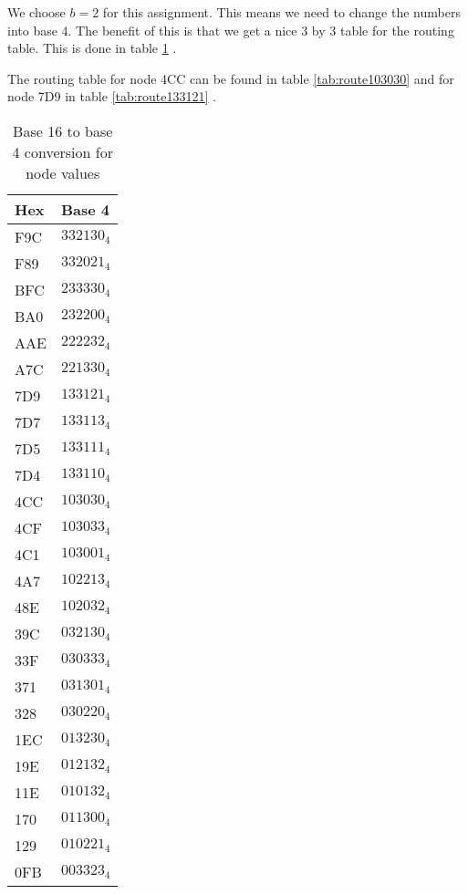 \documentclass{article}
\begin{document}
We choose $b = 2$ for this assignment. This means we need to change the numbers into base 4. The benefit of this is that we get a nice 3 by 3 table for the routing table. This is done in table \ref{tab:b16b4conv} .

The routing table for node 4CC can be found in table \ref{tab:route103030} and for node 7D9 in table \ref{tab:route133121} .

\begin{table}[ht!]
    \begin{center}
    \begin{tabular}{| l | l |}
    \hline
    \bf{Hex}  & \bf{Base 4} \\
    \hline
    F9C         & $ 332130_4 $ \\
    \hline
    F89         & $ 332021_4 $ \\
    \hline
    BFC         & $ 233330_4 $ \\
    \hline
    BA0         & $ 232200_4 $ \\
    \hline
    AAE         & $ 222232_4 $ \\
    \hline
    A7C         & $ 221330_4 $ \\
    \hline
    7D9         & $ 133121_4 $ \\
    \hline
    7D7         & $ 133113_4 $ \\
    \hline
    7D5         & $ 133111_4 $ \\
    \hline
    7D4         & $ 133110_4 $ \\
    \hline
    4CC         & $ 103030_4 $ \\
    \hline
    4CF         & $ 103033_4 $ \\
    \hline
    4C1         & $ 103001_4 $ \\
    \hline
    4A7         & $ 102213_4 $ \\
    \hline
    48E         & $ 102032_4 $ \\
    \hline
    39C         & $ 032130_4 $ \\
    \hline
    33F         & $ 030333_4 $ \\
    \hline
    371         & $ 031301_4 $ \\
    \hline
    328         & $ 030220_4 $ \\
    \hline
    1EC         & $ 013230_4 $ \\
    \hline
    19E         & $ 012132_4 $ \\
    \hline
    11E         & $ 010132_4 $ \\
    \hline
    170         & $ 011300_4 $ \\
    \hline
    129         & $ 010221_4 $ \\
    \hline
    0FB         & $ 003323_4 $ \\
    \hline
    \end{tabular}
    \caption{Base 16 to base 4 conversion for node values}
    \label{tab:b16b4conv}
    \end{center}
\end{table}
\end{document}
